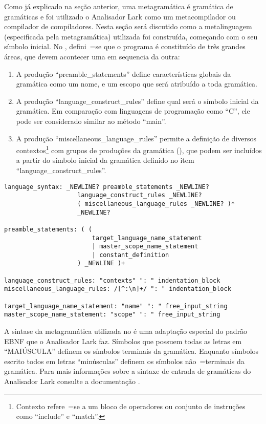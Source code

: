 Como já explicado na seção anterior,
uma metagramática é gramática de gramáticas e
foi utilizado o Analisador Lark \cite{larkContextualLexer} como um metacompilador ou
compilador de compiladores.
Nesta seção será discutido como a metalinguagem (especificada pela metagramática) utilizada foi construída,
começando com o seu símbolo inicial.
No ,
defini~=se que o programa é constituído de três grandes áreas,
que devem acontecer uma em sequencia da outra:
\begin{enumerate}
\item A produção ``preamble\_statements'' define características globais da gramática como um nome,
e um escopo que será atribuído a toda gramática.
\item A produção ``language\_construct\_rules'' define qual será o símbolo inicial da gramática.
Em comparação com linguagens de programação como ``C'',
ele pode ser considerado similar ao método ``main''.
\item A produção ``miscellaneous\_language\_rules'' permite a definição de diversos contextos\footnote{
Contexto refere~=se a um bloco de operadores ou
conjunto de instruções como ``include'' e
``match''.
} com grupos de produções da gramática (),
que podem ser incluídos a partir do símbolo inicial da gramática definido no item ``language\_construct\_rules''.
\end{enumerate}%
\begin{lstlisting}[caption={Simbolo Inicial da Metagramática ``ObjectBeauty''},label={simboloInicialDaMetagramatica},style=yaml_style]
language_syntax: _NEWLINE? preamble_statements _NEWLINE?
                    language_construct_rules _NEWLINE?
                    ( miscellaneous_language_rules _NEWLINE? )*
                    _NEWLINE?

preamble_statements: ( (
                        target_language_name_statement
                        | master_scope_name_statement
                        | constant_definition
                    ) _NEWLINE )+

language_construct_rules: "contexts" ": " indentation_block
miscellaneous_language_rules: /[^:\n]+/ ": " indentation_block

target_language_name_statement: "name" ": " free_input_string
master_scope_name_statement: "scope" ": " free_input_string
\end{lstlisting}

A sintase da metagramática utilizada no  é uma adaptação especial do padrão EBNF que o Analisador Lark faz.
Símbolos que possuem todas as letras em ``MAIÚSCULA'' definem os símbolos terminais da gramática.
Enquanto símbolos escrito todos em letras ``minúsculas'' definem os símbolos não~=terminais da gramática.
Para mais informações sobre a sintaxe de entrada de gramáticas do Analisador Lark consulte a documentação \cite{larkGrammarReference,larkStyleCheat}.


